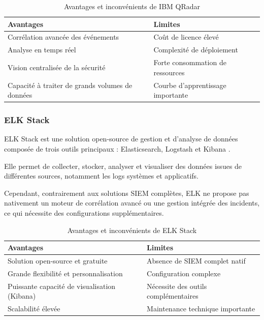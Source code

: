 \documentclass[a4paper,12pt]{report}
\begin{document}
    \begin{table}[H]
        \centering
        \begin{tabular}{|p{6cm}|p{6cm}|}
            \hline
            \textbf{Avantages} & \textbf{Limites} \\
            \hline
            Corrélation avancée des événements & Coût de licence élevé \\
            \hline
            Analyse en temps réel & Complexité de déploiement \\
            \hline
            Vision centralisée de la sécurité & Forte consommation de ressources \\
            \hline
            Capacité à traiter de grands volumes de données & Courbe d’apprentissage importante \\
            \hline
        \end{tabular}
        \caption{Avantages et inconvénients de IBM QRadar}
    \end{table}
    
    \subsubsection{ELK Stack}
    
    ELK Stack est une solution open-source de gestion et d’analyse de données composée de trois outils principaux : Elasticsearch, Logstash et Kibana \cite{elk}.
    
    Elle permet de collecter, stocker, analyser et visualiser des données issues de différentes sources, notamment les logs systèmes et applicatifs.
    
    Cependant, contrairement aux solutions SIEM complètes, ELK ne propose pas nativement un moteur de corrélation avancé ou une gestion intégrée des incidents, ce qui nécessite des configurations supplémentaires.
    
    \begin{table}[H]
        \centering
        \begin{tabular}{|p{6cm}|p{6cm}|}
            \hline
            \textbf{Avantages} & \textbf{Limites} \\
            \hline
            Solution open-source et gratuite & Absence de SIEM complet natif \\
            \hline
            Grande flexibilité et personnalisation & Configuration complexe \\
            \hline
            Puissante capacité de visualisation (Kibana) & Nécessite des outils complémentaires \\
            \hline
            Scalabilité élevée & Maintenance technique importante \\
            \hline
        \end{tabular}
        \caption{Avantages et inconvénients de ELK Stack}
    \end{table}
    
\end{document}
